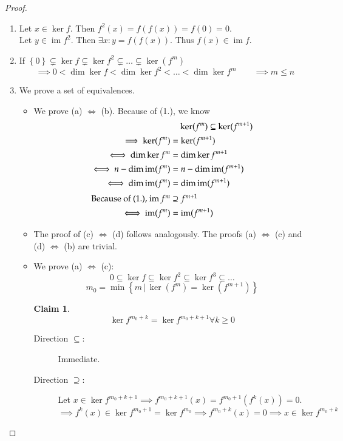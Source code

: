 \documentclass[a4paper]{article}
\numberwithin{lecref}{section}
\newtheorem*{claim}{Claim}
\newcommand{\set}[1]{\left\{#1\right\}}
\newcommand{\setdef}[2]{\left\{\left.#1\,\right|\,#2\right\}}
\DeclareMathOperator{\im}{im}
\begin{document}
\begin{proof}
  \begin{enumerate}
    \item Let $x \in \ker{f}$. Then $f^2(x) = f(f(x)) = f(0) = 0$. \\
      Let $y \in \im{f^2}$. Then $\exists x: y = f(f(x))$. Thus $f(x) \in \im{f}$.
    \item If $\set{0} \subsetneq \ker{f} \subsetneq \ker{f^2} \subsetneq \dots \subsetneq \ker(f^m)$
      \[ \implies 0 < \dim{\ker{f}} < \dim{\ker{f^2}} < \dots < \dim{\ker{f^m}} \qquad
         \implies m \leq n \]
    \item We prove a set of equivalences.
      \begin{itemize}
        \item 
          We prove (a) $\iff$ (b).
          Because of (1.), we know
          \begin{align*}
            &\quad \ker(f^m) \subseteq \ker(f^{m+1}) \\
            \implies \ker(f^m) &= \ker(f^{m+1}) \\
            \iff \dim\ker{f^m} &= \dim\ker{f^{m+1}} \\
            \iff n - \dim\im(f^m) &= n - \dim\im(f^{m+1}) \\
            \iff \dim\im(f^m) &= \dim\im(f^{m+1}) \\
          \intertext{Because of (1.), $\im{f^m} \supseteq f^{m+1}$}
            \iff \im(f^m) &= \im(f^{m+1})
          \end{align*}
        \item
          The proof of (c) $\iff$ (d) follows analogously.
          The proofs (a) $\iff$ (c) and (d) $\iff$ (b) are trivial.
        \item
          We prove (a) $\iff$ (c):
          \[ 0 \subseteq \ker{f} \subseteq \ker{f^2} \subseteq \ker{f^3} \subseteq \dots \]
          \[ m_0 = \min\setdef{m}{\ker(f^m) = \ker(f^{m+1})} \]
          \begin{claim}
            \[ \ker{f^{m_0 + k}} = \ker{f^{m_0 + k + 1}} \forall k \geq 0 \]
          \end{claim}
          \begin{description}
            \item[Direction $\subseteq$:] Immediate.
            \item[Direction $\supseteq$:]
              Let $x \in \ker{f^{m_0 + k + 1}} \implies f^{m_0 + k + 1}(x) = f^{m_0 + 1}(f^k(x)) = 0$.
              \[ \implies f^k(x) \in \ker{f^{m_0 + 1}} = \ker{f^{m_0}} \implies f^{m_0 + k}(x) = 0 \implies x \in \ker{f^{m_0 + k}} \]

\end{description}
\end{itemize}
\end{enumerate}
\end{proof}
\end{document}
